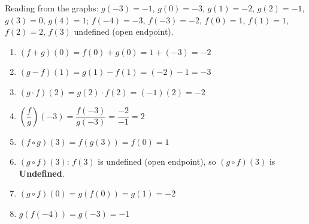 \documentclass{ximera}
\begin{document}
\begin{problem}
\begin{solution}
Reading from the graphs: $g(-3)=-1$, $g(0)=-3$, $g(1)=-2$, $g(2)=-1$, $g(3)=0$, $g(4)=1$; $f(-4)=-3$, $f(-3)=-2$, $f(0)=1$, $f(1)=1$, $f(2)=2$, $f(3)$ undefined (open endpoint).
\begin{enumerate}
  \item[(a)] $(f+g)(0) = f(0)+g(0) = 1+(-3) = -2$
  \item[(b)] $(g-f)(1) = g(1)-f(1) = (-2)-1 = -3$
  \item[(c)] $(g\cdot f)(2) = g(2)\cdot f(2) = (-1)(2) = -2$
  \item[(d)] $\left(\dfrac{f}{g}\right)(-3) = \dfrac{f(-3)}{g(-3)} = \dfrac{-2}{-1} = 2$
  \item[(e)] $(f\circ g)(3) = f(g(3)) = f(0) = 1$
  \item[(f)] $(g\circ f)(3)$: $f(3)$ is undefined (open endpoint), so $(g\circ f)(3)$ is \textbf{Undefined}.
  \item[(g)] $(g\circ f)(0) = g(f(0)) = g(1) = -2$
  \item[(h)] $g(f(-4)) = g(-3) = -1$
\end{enumerate}
\end{solution}
\end{problem}
\end{document}
